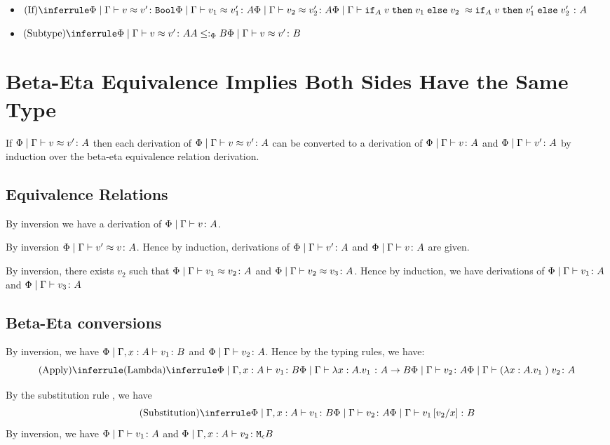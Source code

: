 {\begin{itemize}
        \item $\ntreeruleIII{If}{\gpeberelation{v}{v'}{\B} }{ \gpeberelation{v_1}{v_1'}{A}}{\gpeberelation{v_2}{v_2'}{A}}{\gpeberelation{\pifthenelse{A}{v}{v_1}{v_2}}{\pifthenelse{A}{v}{v_1'}{v_2'}}{A}}$
        \item $\ntreeruleII{Subtype}{\gpeberelation{v}{v'}{A} }{ A \subtypep B}{\gpeberelation{v}{v'}{B}}$
    \end{itemize}

\section{Beta-Eta Equivalence Implies Both Sides Have the Same Type}

    If $\Phi\mid\Gamma \vdash v \approx v' \colon A$ then each derivation of $\Phi\mid\Gamma \vdash v \approx v' \colon A$ can be converted to a derivation of $\Phi\mid\Gamma \vdash v \colon A$ and $\Phi\mid\Gamma \vdash v' \colon A$ by induction over the beta-eta equivalence relation derivation.

    \subsection{Equivalence Relations}
    By inversion we have a derivation of $\Phi\mid\Gamma \vdash v \colon A$.

    By inversion $\Phi\mid\Gamma \vdash v' \approx v \colon A$. Hence by induction, derivations of $\Phi\mid\Gamma \vdash v' \colon A$ and $\Phi\mid\Gamma \vdash v \colon A$ are given.

    By inversion, there exists $v_2$ such that $\Phi\mid\Gamma \vdash v_1 \approx v_2 \colon A$ and $\Phi\mid\Gamma \vdash v_2 \approx v_3 \colon A$. Hence by induction, we have derivations of $\Phi\mid\Gamma \vdash v_1 \colon A$ and $\Phi\mid\Gamma \vdash v_3 \colon A$

    \subsection{Beta-Eta conversions}
    
        By inversion, we have $\Phi\mid\Gamma, x: A \vdash v_1 \colon B$ and $\Phi\mid\Gamma \vdash v_2 \colon A$. Hence by the typing rules, we have:
        $$\ntreeruleII{Apply}{
            \ntreeruleI{Lambda}{\etyperelation{\P}{\gax }{v_1}{B}}{\gpetyperelation{\lam{x}{A}{v_1}}{\ab}}
            }{
            \gpetyperelation{v_2}{A}
        }{\gpetyperelation{\apply{(\lam{x}{A}{v_1})}{v_2}}{A}}$$

        By the substitution rule , we have 
        $$\ntreeruleII{Substitution}{\etyperelation{\P}{\gax}{v_1}{B}}{\gpetyperelation{v_2}{A}}{\gpetyperelation{v_1\ssub{x}{v_2}}{B}}$$
        By inversion, we have $\Phi\mid\Gamma \vdash v_1 \colon A$ and $\Phi\mid\Gamma, x: A  \vdash v_2 \colon \texttt{M}_{\epsilon}{B}$

}
